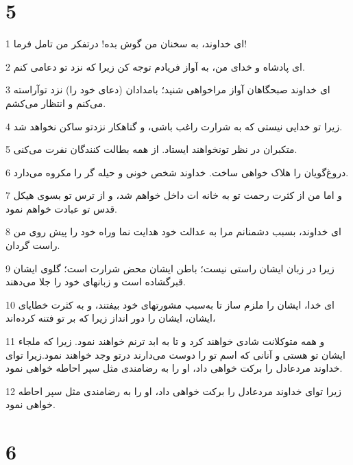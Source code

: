 \chapter{5}

\par 1 ای خداوند، به سخنان من گوش بده! درتفکر من تامل فرما!
\par 2 ‌ای پادشاه و خدای من، به آواز فریادم توجه کن زیرا که نزد تو دعامی کنم.
\par 3 ‌ای خداوند صبحگاهان آواز مراخواهی شنید؛ بامدادان (دعای خود را) نزد توآراسته می‌کنم و انتظار می‌کشم.
\par 4 زیرا تو خدایی نیستی که به شرارت راغب باشی، و گناهکار نزدتو ساکن نخواهد شد.
\par 5 متکبران در نظر تونخواهند ایستاد. از همه بطالت کنندگان نفرت می‌کنی.
\par 6 دروغ‌گویان را هلاک خواهی ساخت. خداوند شخص خونی و حیله گر را مکروه می‌دارد.
\par 7 و اما من از کثرت رحمت تو به خانه ات داخل خواهم شد، و از ترس تو بسوی هیکل قدس تو عبادت خواهم نمود.
\par 8 ‌ای خداوند، بسبب دشمنانم مرا به عدالت خود هدایت نما وراه خود را پیش روی من راست گردان.
\par 9 زیرا در زبان ایشان راستی نیست؛ باطن ایشان محض شرارت است؛ گلوی ایشان قبرگشاده است و زبانهای خود را جلا می‌دهند.
\par 10 ‌ای خدا، ایشان را ملزم ساز تا به‌سبب مشورتهای خود بیفتند، و به کثرت خطایای ایشان، ایشان را دور انداز زیرا که بر تو فتنه کرده‌اند،
\par 11 و همه متوکلانت شادی خواهند کرد و تا به ابد ترنم خواهند نمود. زیرا که ملجاء ایشان تو هستی و آنانی که اسم تو را دوست می‌دارند درتو وجد خواهند نمود.زیرا تو‌ای خداوند مردعادل را برکت خواهی داد، او را به رضامندی مثل سپر احاطه خواهی نمود.
\par 12 زیرا تو‌ای خداوند مردعادل را برکت خواهی داد، او را به رضامندی مثل سپر احاطه خواهی نمود.
 
\chapter{6}

